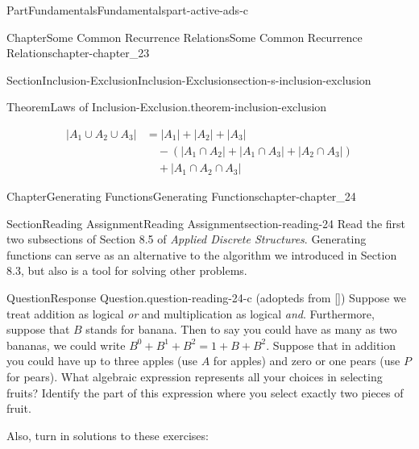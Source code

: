 \documentclass[oneside,10pt,]{book}
\newcommand{\xreffont}{\relax}
\numberwithin{equation}{section}
\begin{document}
\begin{partptx}{Part}{Fundamentals}{}{Fundamentals}{}{}{part-active-ads-c}
\begin{chapterptx}{Chapter}{Some Common Recurrence Relations}{}{Some Common Recurrence Relations}{}{}{chapter-chapter_23}
\begin{sectionptx}{Section}{Inclusion-Exclusion}{}{Inclusion-Exclusion}{}{}{section-s-inclusion-exclusion}
\begin{theorem}{Theorem}{Laws of Inclusion-Exclusion.}{}{theorem-inclusion-exclusion}
\begin{enumerate}[label=(\alph*)]
\begin{equation*}
\begin{split}
\lvert A_1 \cup A_2 \cup A_3 \rvert & =\lvert A_1 \rvert + \lvert A_2 \rvert + \lvert A_3 \rvert\\
&\quad - (\lvert A_1 \cap A_2 \rvert + \lvert A_1 \cap A_3 \rvert+ \lvert A_2 \cap A_3 \rvert)\\
&\quad + \lvert A_1 \cap A_2 \cap A_3 \rvert
\end{split} 
\end{equation*}
%
\end{enumerate}
%
\end{theorem}
\end{sectionptx}
\end{chapterptx}
%
\typeout{************************************************}
\typeout{************************************************}
%
\begin{chapterptx}{Chapter}{Generating Functions}{}{Generating Functions}{}{}{chapter-chapter_24}
\renewcommand*{\chaptername}{Chapter}
\index{}%
%
%
\typeout{************************************************}
\typeout{************************************************}
%
\begin{sectionptx}{Section}{Reading Assignment}{}{Reading Assignment}{}{}{section-reading-24}
Read the first two subsections of Section 8.5 of \emph{Applied Discrete Structures}. Generating functions can serve as an alternative to the algorithm we introduced in Section 8.3, but also is a tool for solving other problems.%
\begin{question}{Question}{Response Question.}{question-reading-24-c}%
(adopteds from \hyperlink{biblio-biblio-bogart-2017}{[{\xreffont 1}]}) Suppose we treat addition as logical \emph{or} and multiplication as logical \emph{and}.  Furthermore, suppose that \(B\) stands for banana.  Then to say you could have as many as two bananas, we could write \(B^0+B^1+B^2=1+B+B^2\).  Suppose that in addition you could have up to three apples (use \(A\) for apples) and zero or one pears (use \(P\) for pears).  What algebraic expression represents all your choices in selecting fruits?  Identify the part of this expression where you select exactly two pieces of fruit.%
\end{question}
Also, turn in solutions to these exercises:%
%
%
\typeout{************************************************}
\typeout{************************************************}

\end{sectionptx}
\end{chapterptx}
\end{partptx}
\end{document}
